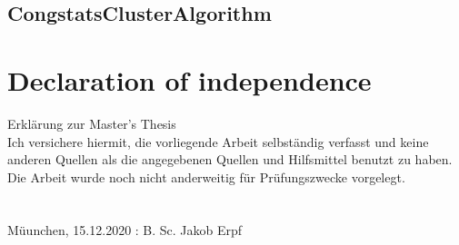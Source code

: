 \documentclass[a4paper,headsepline,footsepline,fontsize=11pt,BCOR=12mm,DIV=12]{report}
\newcommand{\nocontentsline}[3]{}
\newcommand{\tocless}[2]{\bgroup\let\addcontentsline=\nocontentsline#1{#2}\egroup}
\begin{document}
\begin{appendices}
% 

\tocless\section{CongstatsClusterAlgorithm}
%		





\end{appendices}

\pagebreak

\chapter*{Declaration of independence}

Erklärung zur Master’s Thesis
\newline \\
Ich versichere hiermit, die vorliegende Arbeit selbständig verfasst und keine anderen Quellen als die angegebenen Quellen und Hilfsmittel benutzt zu haben. Die Arbeit wurde noch nicht anderweitig für Prüfungszwecke vorgelegt. 
\newline \\ \\ \\
Müunchen, 15.12.2020 : \hrulefill \newline
\hspace*{0mm}\phantom{München, 11.12.2020: } B. Sc. Jakob Erpf
\end{document}
